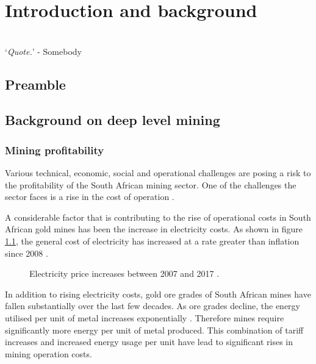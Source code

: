 \chapter{Introduction and background}  %
\thispagestyle{empty}
\vspace{38em}
\hrulefill
\\
\enquote*{\textit{Quote.}} - Somebody\\
\newpage

\section{Preamble}
\section{Background on deep level mining}
	\subsection{Mining profitability}
	 	Various technical, economic, social and operational challenges are posing a risk to the profitability of the South African mining sector. One of the challenges the sector faces  is a rise in the cost of operation \cite{neingo2016trends}.\par
		A considerable factor that is contributing to the rise of operational costs in South African gold mines has been the increase in electricity costs. As shown in figure \ref{fig: Eskom tariffs}, the general cost of electricity has increased at a rate greater than inflation since 2008 \cite{Eskom2013Tariffs}.
		\begin{figure}[h]
			\centering
			\fbox{}
			\caption[Electricity price increases between 2007 and 2017.]{Electricity price 		increases between 2007 and 2017 \cite{Eskom2013Tariffs,Inflation2013}.}
			\label{fig: Eskom tariffs}
		\end{figure}
		\par
		In addition to rising electricity costs, gold ore grades of South African mines have fallen substantially over the last few decades\cite{mudd2007global}. As ore grades decline, the energy utilised per unit of metal increases exponentially \cite{muller2010numerical}. Therefore mines require significantly more energy per unit of metal produced. This combination of tariff increases and increased energy usage per unit have lead to significant rises in mining operation costs.
